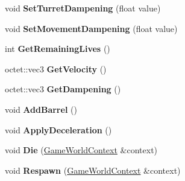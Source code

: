 \begin{DoxyCompactItemize}
\item 
\hypertarget{class_arena_1_1_player_a84193884efbb3cec45ab0d3364cacc15}{void {\bfseries Set\+Turret\+Dampening} (float value)}\label{class_arena_1_1_player_a84193884efbb3cec45ab0d3364cacc15}

\item 
\hypertarget{class_arena_1_1_player_aeb4cdcd09fd10f1d9117dc59ecf9985d}{void {\bfseries Set\+Movement\+Dampening} (float value)}\label{class_arena_1_1_player_aeb4cdcd09fd10f1d9117dc59ecf9985d}

\item 
\hypertarget{class_arena_1_1_player_a9b32bddf5f59ed88b9efd485e15ce347}{int {\bfseries Get\+Remaining\+Lives} ()}\label{class_arena_1_1_player_a9b32bddf5f59ed88b9efd485e15ce347}

\item 
\hypertarget{class_arena_1_1_player_ab093919e83236c721beeae9f9d29621b}{octet\+::vec3 {\bfseries Get\+Velocity} ()}\label{class_arena_1_1_player_ab093919e83236c721beeae9f9d29621b}

\item 
\hypertarget{class_arena_1_1_player_a37328c92147483bbbed26c9510767630}{octet\+::vec3 {\bfseries Get\+Dampening} ()}\label{class_arena_1_1_player_a37328c92147483bbbed26c9510767630}

\item 
\hypertarget{class_arena_1_1_player_aa909d09aeec8fdfff91e8560157604f9}{void {\bfseries Add\+Barrel} ()}\label{class_arena_1_1_player_aa909d09aeec8fdfff91e8560157604f9}

\item 
\hypertarget{class_arena_1_1_player_acd5c1127e541903daf6de6e493f395c2}{void {\bfseries Apply\+Deceleration} ()}\label{class_arena_1_1_player_acd5c1127e541903daf6de6e493f395c2}

\item 
\hypertarget{class_arena_1_1_player_a36b05e4e889e2c4cf3b4b32f9e8ad6e8}{void {\bfseries Die} (\hyperlink{struct_arena_1_1_game_world_context}{Game\+World\+Context} \&context)}\label{class_arena_1_1_player_a36b05e4e889e2c4cf3b4b32f9e8ad6e8}

\item 
\hypertarget{class_arena_1_1_player_aca494aed5b70e78c31f68f6046f95fb2}{void {\bfseries Respawn} (\hyperlink{struct_arena_1_1_game_world_context}{Game\+World\+Context} \&context)}\label{class_arena_1_1_player_aca494aed5b70e78c31f68f6046f95fb2}

\end{DoxyCompactItemize}
